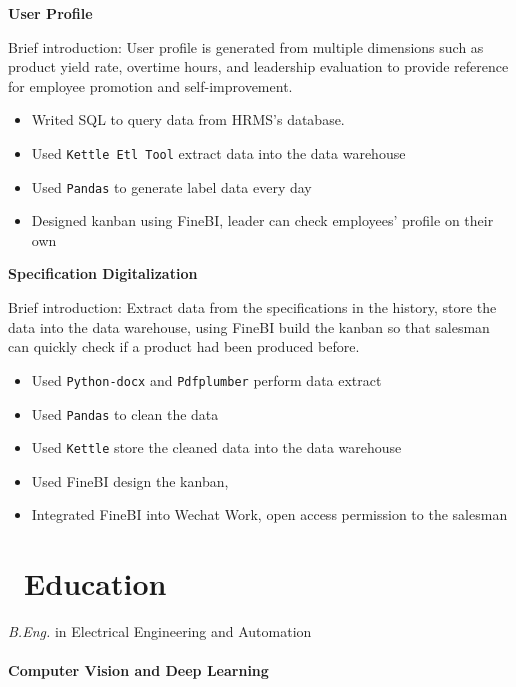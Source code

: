 \documentclass{resume}
\begin{document}
\begin{onehalfspacing}
\textbf{User Profile}

Brief introduction: User profile is generated from multiple dimensions such as product yield rate, overtime hours, and leadership evaluation to provide reference for employee promotion and self-improvement.
\begin{itemize}
\item Writed SQL to query data from HRMS's database.
\item Used \texttt{Kettle Etl Tool} extract data into the data warehouse
\item Used \texttt{Pandas} to generate label data every day
\item Designed kanban using FineBI, leader can check employees' profile on their own
\end{itemize}
\end{onehalfspacing}

\begin{onehalfspacing}
\textbf{Specification Digitalization}

Brief introduction: Extract data from the specifications in the history, store the data into the data warehouse, using FineBI build the kanban so that salesman can quickly check if a product had been produced before.
\begin{itemize}
\item Used \texttt{Python-docx} and \texttt{Pdfplumber} perform data extract
\item Used \texttt{Pandas} to clean the data
\item Used \texttt{Kettle} store the cleaned data into the data warehouse
\item Used FineBI design the kanban,
\item Integrated FineBI into Wechat Work, open access permission to the salesman
\end{itemize}
\end{onehalfspacing}

\section{\faGraduationCap\ Education}
\textit{B.Eng.} in Electrical Engineering and Automation
\\~\\
\textbf{Computer Vision and Deep Learning}
\end{document}
